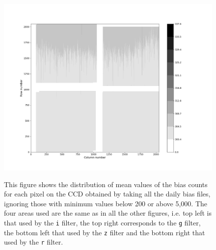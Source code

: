 \begin{figure}[!htbp]
\begin{center}
\includegraphics[scale=0.3]{images/mean_allbiaslim250_5000.png}
\end{center}   
\caption{This figure shows the distribution of mean values of the bias counts
for each pixel on the CCD obtained by taking all the daily bias files, ignoring
those with minimum values below 200 or above 5,000. The four areas used are the
same as in all the other figures, i.e. top left is that used by the \texttt{i}
filter, the top right corresponds to the \texttt{g} filter, the bottom left
that used by the \texttt{z} filter and the bottom right that used by the
\texttt{r} filter.} \protect\label{fig:mean_allbiaslim250_5000}
\end{figure}

